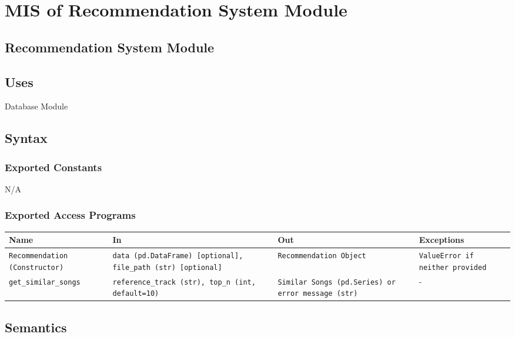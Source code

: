 \documentclass[12pt, titlepage]{article}
\begin{document}
{\color{red}
\section{MIS of Recommendation System Module}

\subsection{Recommendation System Module}

\subsection{Uses}
Database Module
\subsection{Syntax}

\subsubsection{Exported Constants}
N/A

\subsubsection{Exported Access Programs}

\begin{center}
  \begin{tabular}{|p{6cm}|p{4cm}|p{3cm}|p{2cm}|}
  \hline
  \textbf{Name} & \textbf{In} & \textbf{Out} & \textbf{Exceptions} \\
  \hline
  \texttt{Recommendation (Constructor)} & \texttt{data (pd.DataFrame) [optional], file\_path (str) [optional]} & \texttt{Recommendation Object} & \texttt{ValueError if neither provided} \\
  \hline
  \texttt{get\_similar\_songs} & \texttt{reference\_track (str), top\_n (int, default=10)} & \texttt{Similar Songs (pd.Series) or error message (str)} & - \\
  \hline
  \end{tabular}
\end{center}

\subsection{Semantics}

}
\end{document}
